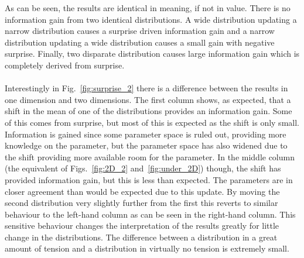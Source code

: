 \documentclass[twocolumn]{revtex4-1}
\begin{document}
    \noindent As can be seen, the results are identical in meaning, if not in value.
    There is no information gain from two identical distributions.
    A wide distribution updating a narrow distribution causes a surprise driven information gain and a narrow distribution updating a wide distribution causes a small gain with negative surprise.
    Finally, two disparate distribution causes large information gain which is completely derived from surprise.
    \\
    \\
    Interestingly in Fig.~\ref{fig:surprise_2} there is a difference between the results in one dimension and two dimensions.
    The first column shows, as expected, that a shift in the mean of one of the distributions provides an information gain.
    Some of this comes from surprise, but most of this is expected as the shift is only small.
    Information is gained since some parameter space is ruled out, providing more knowledge on the parameter, but the parameter space has also widened due to the shift providing more available room for the parameter.
    In the middle column (the equivalent of Figs.~\ref{fig:2D_2} and~\ref{fig:under_2D}) though, the shift has provided information gain, but this is less than expected.
    The parameters are in closer agreement than would be expected due to this update.
    By moving the second distribution very slightly further from the first this reverts to similar behaviour to the left-hand column as can be seen in the right-hand column.
    This sensitive behaviour changes the interpretation of the results greatly for little change in the distributions.
    The difference between a distribution in a great amount of tension and a distribution in virtually no tension is extremely small.
\end{document}
